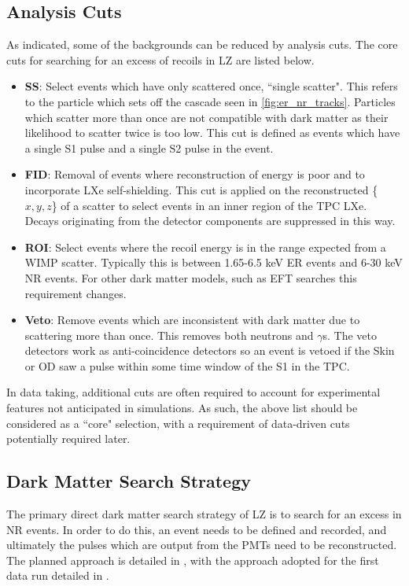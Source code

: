 \subsection{Analysis Cuts}
\label{sec:lz_analysis_cuts}
\par
As indicated, some of the backgrounds can be reduced by analysis cuts. 
The core cuts for searching for an excess of recoils in LZ are listed below.
\begin{itemize}
    \item \textbf{SS}: Select events which have only scattered once, ``single scatter". This refers to the particle which sets off the cascade seen in \autoref{fig:er_nr_tracks}. Particles which scatter more than once are not compatible with dark matter as their likelihood to scatter twice is too low. This cut is defined as events which have a single S1 pulse and a single S2 pulse in the event.
    \item \textbf{FID}: Removal of events where reconstruction of energy is poor and to incorporate LXe self-shielding. This cut is applied on the reconstructed \{$x,y,z$\} of a scatter to select events in an inner region of the TPC LXe. Decays originating from the detector components are suppressed in this way.
    \item \textbf{ROI}: Select events where the recoil energy is in the range expected from a WIMP scatter. Typically this is between 1.65-6.5 keV ER events and 6-30 keV NR events. For other dark matter models, such as EFT searches this requirement changes.%
    \item \textbf{Veto}: Remove events which are inconsistent with dark matter due to scattering more than once. This removes both neutrons and $\gamma$s. The veto detectors work as anti-coincidence detectors so an event is vetoed if the Skin or OD saw a pulse within some time window of the S1 in the TPC.
\end{itemize}
In data taking, additional cuts are often required to account for experimental features not anticipated in simulations.
As such, the above list should be considered as a ``core" selection, with a requirement of data-driven cuts potentially required later.

\subsection{Dark Matter Search Strategy}
\par
The primary direct dark matter search strategy of LZ is to search for an excess in NR events.
In order to do this, an event needs to be defined and recorded, and ultimately the pulses which are output from the PMTs need to be reconstructed.
The planned approach is detailed in \cite{LZ_TechnicalDesignReview_ref}, with the approach adopted for the first data run detailed in \cite{lz_ws_sr1_ref}.

